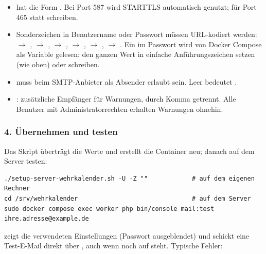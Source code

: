 \begin{itemize}
  \item {} hat die Form
        . Bei Port 587
        wird STARTTLS automatisch genutzt; für Port 465 
        statt  schreiben.
  \item Sonderzeichen in Benutzername oder Passwort müssen URL-kodiert
        werden:  $\rightarrow$ , \code{:} $\rightarrow$
        , \code{/} $\rightarrow$ , \code{\#}
        $\rightarrow$ ,  $\rightarrow$ ,
        \code{\%} $\rightarrow$ . Ein \code{\$} im Passwort
        wird von Docker Compose als Variable gelesen: den ganzen Wert in
        einfache Anführungszeichen setzen (wie oben) oder \code{\$\$}
        schreiben.
  \item {} muss beim SMTP-Anbieter als Absender erlaubt sein.
        Leer bedeutet .
  \item {}: zusätzliche Empfänger für Warnungen,
        durch Komma getrennt. Alle Benutzer mit Administratorrechten
        erhalten Warnungen ohnehin.
\end{itemize}

\subsubsection*{4. Übernehmen und testen}

Das Skript überträgt die Werte und erstellt die Container neu; danach auf
dem Server testen:

\begin{lstlisting}
./setup-server-wehrkalender.sh -U -Z ""            # auf dem eigenen Rechner
cd /srv/wehrkalender                               # auf dem Server
sudo docker compose exec worker php bin/console mail:test ihre.adresse@example.de
\end{lstlisting}

 zeigt die verwendeten Einstellungen (Passwort ausgeblendet)
und schickt eine Test-E-Mail direkt über , auch wenn
 noch auf  steht. Typische Fehler:

